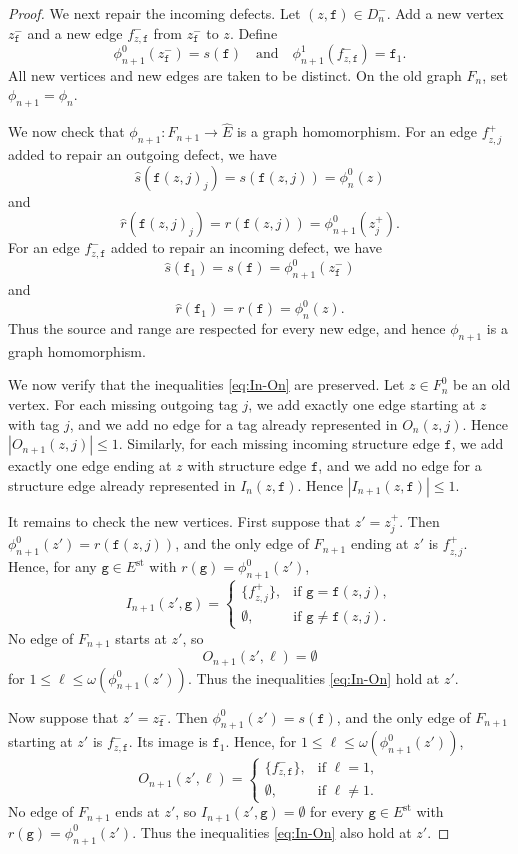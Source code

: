 \documentclass{article}
\theoremstyle{definition}
\begin{document}
\begin{proof}
We next repair the incoming defects. Let $(z,\mathtt{f})\in D_n^-$. Add a new vertex $z_{\mathtt{f}}^-$ and a new edge $f_{z,\mathtt{f}}^-$ from $z_{\mathtt{f}}^-$ to $z$. Define
$$
\phi_{n+1}^0(z_{\mathtt{f}}^-)=s(\mathtt{f})\quad\text{and}\quad
\phi_{n+1}^1(f_{z,\mathtt{f}}^-)=\mathtt{f}_1.
$$
All new vertices and new edges are taken to be distinct. On the old graph $F_n$, set $\phi_{n+1}=\phi_n$.

We now check that $\phi_{n+1}:F_{n+1}\to\widehat E$ is a graph homomorphism. For an edge $f_{z,j}^+$ added to repair an outgoing defect, we have
$$
\widehat s(\mathtt{f}(z,j)_j)=s(\mathtt{f}(z,j))=\phi_n^0(z)
$$
and
$$
\widehat r(\mathtt{f}(z,j)_j)=r(\mathtt{f}(z,j))=\phi_{n+1}^0(z_j^+).
$$
For an edge $f_{z,\mathtt{f}}^-$ added to repair an incoming defect, we have
$$
\widehat s(\mathtt{f}_1)=s(\mathtt{f})=\phi_{n+1}^0(z_{\mathtt{f}}^-)
$$
and
$$
\widehat r(\mathtt{f}_1)=r(\mathtt{f})=\phi_n^0(z).
$$
Thus the source and range are respected for every new edge, and hence $\phi_{n+1}$ is a graph homomorphism.

We now verify that the inequalities \eqref{eq:In-On} are preserved. Let $z\in F_n^0$ be an old vertex. For each missing outgoing tag $j$, we add exactly one edge starting at $z$ with tag $j$, and we add no edge for a tag already represented in $O_n(z,j)$. Hence $|O_{n+1}(z,j)|\leq 1$. Similarly, for each missing incoming structure edge $\mathtt{f}$, we add exactly one edge ending at $z$ with structure edge $\mathtt{f}$, and we add no edge for a structure edge already represented in $I_n(z,\mathtt{f})$. Hence $|I_{n+1}(z,\mathtt{f})|\leq 1$.

It remains to check the new vertices. First suppose that $z'=z_j^+$. Then $\phi_{n+1}^0(z')=r(\mathtt{f}(z,j))$, and the only edge of $F_{n+1}$ ending at $z'$ is $f_{z,j}^+$. Hence, for any $\mathtt{g}\in E^{\mathrm{st}}$ with $r(\mathtt{g})=\phi_{n+1}^0(z')$,
$$
I_{n+1}(z',\mathtt{g})=
\begin{cases}
\{f_{z,j}^+\},&\text{if }\mathtt{g}=\mathtt{f}(z,j),\\
\emptyset,&\text{if }\mathtt{g}\neq \mathtt{f}(z,j).
\end{cases}
$$
No edge of $F_{n+1}$ starts at $z'$, so
$$
O_{n+1}(z',\ell)=\emptyset
$$
for $1\leq \ell\leq \omega(\phi_{n+1}^0(z'))$. Thus the inequalities \eqref{eq:In-On} hold at $z'$.

Now suppose that $z'=z_{\mathtt{f}}^-$. Then $\phi_{n+1}^0(z')=s(\mathtt{f})$, and the only edge of $F_{n+1}$ starting at $z'$ is $f_{z,\mathtt{f}}^-$. Its image is $\mathtt{f}_1$. Hence, for $1\leq \ell\leq \omega(\phi_{n+1}^0(z'))$,
$$
O_{n+1}(z',\ell)=
\begin{cases}
\{f_{z,\mathtt{f}}^-\},&\text{if }\ell=1,\\
\emptyset,&\text{if }\ell\neq 1.
\end{cases}
$$
No edge of $F_{n+1}$ ends at $z'$, so $I_{n+1}(z',\mathtt{g})=\emptyset$ for every $\mathtt{g}\in E^{\mathrm{st}}$ with $r(\mathtt{g})=\phi_{n+1}^0(z')$. Thus the inequalities \eqref{eq:In-On} also hold at $z'$.


\end{proof}
\end{document}
